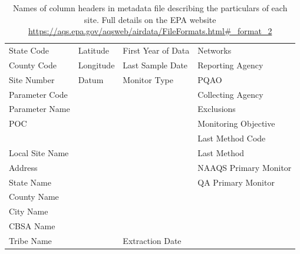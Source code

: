 \documentclass{article}
\begin{document}
\begin{table}[ht]
	\centering
	\begin{tabular}{l|l|l|l}
		\hline
		State Code & Latitude & First Year of Data &  Networks\\
		County Code & Longitude & Last Sample Date &  Reporting Agency\\
		Site Number & Datum & Monitor Type & PQAO\\
		Parameter Code & & & Collecting Agency\\
		Parameter Name & & & Exclusions\\
		POC & & & Monitoring Objective\\
		& & & Last Method Code \\
		Local Site Name & & & Last Method \\
		Address & & & NAAQS Primary Monitor \\
		State Name & & & QA Primary Monitor \\
		County Name & & & \\
		City Name & & & \\
		CBSA Name & & & \\
		Tribe Name & & Extraction Date & \\
	\end{tabular}
	\caption{Names of column headers in metadata file describing the particulars of each site.  Full details on the \ac{EPA} website \url{https://aqs.epa.gov/aqsweb/airdata/FileFormats.html\#_format_2}}
	\label{table:metadata_column_headers}
\end{table}
\end{document}
